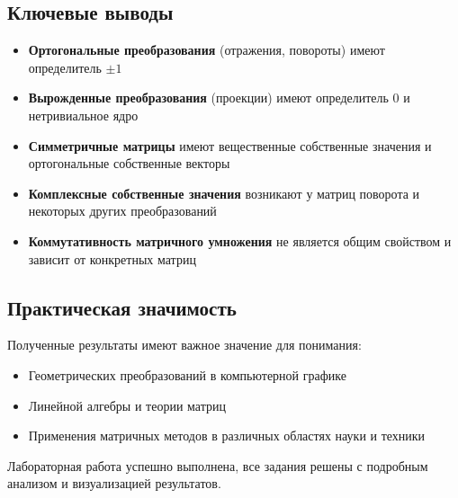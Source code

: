\subsection*{Ключевые выводы}

\begin{itemize}
\item \textbf{Ортогональные преобразования} (отражения, повороты) имеют определитель $\pm 1$
\item \textbf{Вырожденные преобразования} (проекции) имеют определитель $0$ и нетривиальное ядро
\item \textbf{Симметричные матрицы} имеют вещественные собственные значения и ортогональные собственные векторы
\item \textbf{Комплексные собственные значения} возникают у матриц поворота и некоторых других преобразований
\item \textbf{Коммутативность матричного умножения} не является общим свойством и зависит от конкретных матриц
\end{itemize}

\subsection*{Практическая значимость}

Полученные результаты имеют важное значение для понимания:
\begin{itemize}
\item Геометрических преобразований в компьютерной графике
\item Линейной алгебры и теории матриц
\item Применения матричных методов в различных областях науки и техники
\end{itemize}

Лабораторная работа успешно выполнена, все задания решены с подробным анализом и визуализацией результатов.
